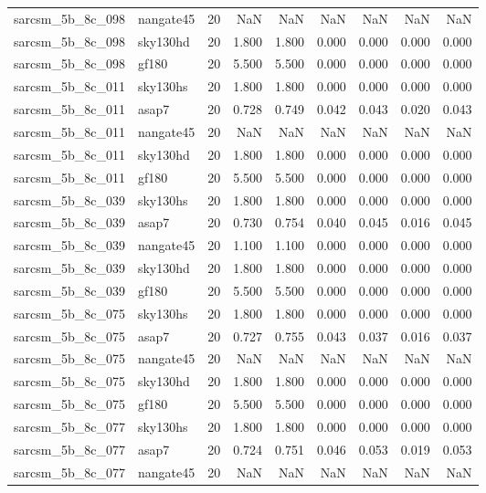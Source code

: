 \begin{tabular}{llrrrrrrr}
sarcsm\_5b\_8c\_098 & nangate45 & 20 & NaN & NaN & NaN & NaN & NaN & NaN \\
sarcsm\_5b\_8c\_098 & sky130hd & 20 & 1.800 & 1.800 & 0.000 & 0.000 & 0.000 & 0.000 \\
sarcsm\_5b\_8c\_098 & gf180 & 20 & 5.500 & 5.500 & 0.000 & 0.000 & 0.000 & 0.000 \\
sarcsm\_5b\_8c\_011 & sky130hs & 20 & 1.800 & 1.800 & 0.000 & 0.000 & 0.000 & 0.000 \\
sarcsm\_5b\_8c\_011 & asap7 & 20 & 0.728 & 0.749 & 0.042 & 0.043 & 0.020 & 0.043 \\
sarcsm\_5b\_8c\_011 & nangate45 & 20 & NaN & NaN & NaN & NaN & NaN & NaN \\
sarcsm\_5b\_8c\_011 & sky130hd & 20 & 1.800 & 1.800 & 0.000 & 0.000 & 0.000 & 0.000 \\
sarcsm\_5b\_8c\_011 & gf180 & 20 & 5.500 & 5.500 & 0.000 & 0.000 & 0.000 & 0.000 \\
sarcsm\_5b\_8c\_039 & sky130hs & 20 & 1.800 & 1.800 & 0.000 & 0.000 & 0.000 & 0.000 \\
sarcsm\_5b\_8c\_039 & asap7 & 20 & 0.730 & 0.754 & 0.040 & 0.045 & 0.016 & 0.045 \\
sarcsm\_5b\_8c\_039 & nangate45 & 20 & 1.100 & 1.100 & 0.000 & 0.000 & 0.000 & 0.000 \\
sarcsm\_5b\_8c\_039 & sky130hd & 20 & 1.800 & 1.800 & 0.000 & 0.000 & 0.000 & 0.000 \\
sarcsm\_5b\_8c\_039 & gf180 & 20 & 5.500 & 5.500 & 0.000 & 0.000 & 0.000 & 0.000 \\
sarcsm\_5b\_8c\_075 & sky130hs & 20 & 1.800 & 1.800 & 0.000 & 0.000 & 0.000 & 0.000 \\
sarcsm\_5b\_8c\_075 & asap7 & 20 & 0.727 & 0.755 & 0.043 & 0.037 & 0.016 & 0.037 \\
sarcsm\_5b\_8c\_075 & nangate45 & 20 & NaN & NaN & NaN & NaN & NaN & NaN \\
sarcsm\_5b\_8c\_075 & sky130hd & 20 & 1.800 & 1.800 & 0.000 & 0.000 & 0.000 & 0.000 \\
sarcsm\_5b\_8c\_075 & gf180 & 20 & 5.500 & 5.500 & 0.000 & 0.000 & 0.000 & 0.000 \\
sarcsm\_5b\_8c\_077 & sky130hs & 20 & 1.800 & 1.800 & 0.000 & 0.000 & 0.000 & 0.000 \\
sarcsm\_5b\_8c\_077 & asap7 & 20 & 0.724 & 0.751 & 0.046 & 0.053 & 0.019 & 0.053 \\
sarcsm\_5b\_8c\_077 & nangate45 & 20 & NaN & NaN & NaN & NaN & NaN & NaN \\

\end{tabular}
